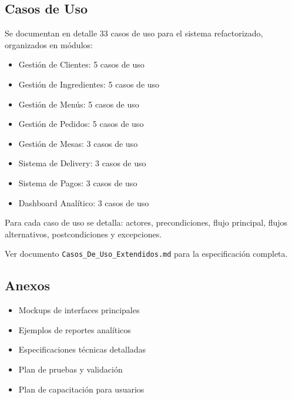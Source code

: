 \documentclass[12pt]{article}
\begin{document}
\subsection{Casos de Uso}
Se documentan en detalle 33 casos de uso para el sistema refactorizado, organizados en módulos:
\begin{itemize}
  \item Gestión de Clientes: 5 casos de uso
  \item Gestión de Ingredientes: 5 casos de uso
  \item Gestión de Menús: 5 casos de uso
  \item Gestión de Pedidos: 5 casos de uso
  \item Gestión de Mesas: 3 casos de uso
  \item Sistema de Delivery: 3 casos de uso
  \item Sistema de Pagos: 3 casos de uso
  \item Dashboard Analítico: 3 casos de uso
\end{itemize}

Para cada caso de uso se detalla: actores, precondiciones, flujo principal, flujos alternativos, postcondiciones y excepciones.

Ver documento \texttt{Casos\_De\_Uso\_Extendidos.md} para la especificación completa.

\subsection{Anexos}
\begin{itemize}
  \item Mockups de interfaces principales
  \item Ejemplos de reportes analíticos
  \item Especificaciones técnicas detalladas
  \item Plan de pruebas y validación
  \item Plan de capacitación para usuarios
\end{itemize}
\end{document}
